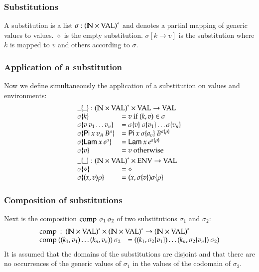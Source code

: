 \subsubsection{Substitutions}
A substitution is a list $\sigma : {(\mathbb{N} \times \operatorname{VAL})}^{\ast} $ and denotes a partial mapping of generic values to values.
$\diamond$ is the empty substitution.
$\sigma[k \rightarrow v] $ is the substitution where $k$ is mapped to $v$ and others according to $\sigma$.

\subsubsection{Application of a substitution}
Now we define simultaneously the application of a substitution on values and environments:
\[
\begin{array}{ll}
\multicolumn{2}{l}{\subst{\_}{\_} : \ves{(\cN \times \Val)} \times \Val \ra \Val} \\
\subst{\sigma}{k} & = v \mbox{ if } (k,v) \in \sigma \\
\subst{\sigma}{v \: v_1 \ldots v_n} & = \subst{\sigma}{v} \: \subst{\sigma}{v_1} \ldots \subst{\sigma}{v_n}\\
\subst{\sigma}{\vpi \: x \: v_A \: \cl{B}{\rho}} & = \vpi \: x \: \subst{\sigma}{a_v} \: \cl{B}{\subst{\sigma}{\rho}} \\
\subst{\sigma}{\vlam \: x \: \cl{e}{\rho}} & = \vlam \: x \: \cl{e}{\subst{\sigma}{\rho}} \\
\subst{\sigma}{v} & = v \mbox{ otherwise }
\vs\\
\multicolumn{2}{l}{\substEnv{\_}{\_} : \ves{(\cN \times \Val)} \times \Env \ra \Val} \\
\substEnv{\sigma}{\diamond} & = \diamond \\
\substEnv{\sigma}{(x,v)\rho} & = (x,\subst{\sigma}{v}) \substEnv{\sigma}{\rho} \\
\end{array}
\]

\subsubsection{Composition of substitutions}
Next is the composition $\operatorname{comp}\:\sigma_1\:\sigma_2$ of two substitutions $\sigma_1$ and $\sigma_2$:
\[
\begin{array}{ll}
\multicolumn{2}{l}{\compS : \ves{(\cN \times \Val)} \times \ves{(\cN \times \Val)} \ra \ves{(\cN \times \Val)}} \\
\compS{((k_1,v_1)\ldots(k_n,v_n))}{\sigma_2} & = ((k_1,\subst{\sigma_2}{v_1})\ldots(k_n,\subst{\sigma_2}{v_n})\: \sigma_2) 
\end{array}
\]
It is assumed that the domains of the substitutions are disjoint and that there are no occurrences of the generic values of $\sigma_1$ in the values of the codomain of $\sigma_2$.  


